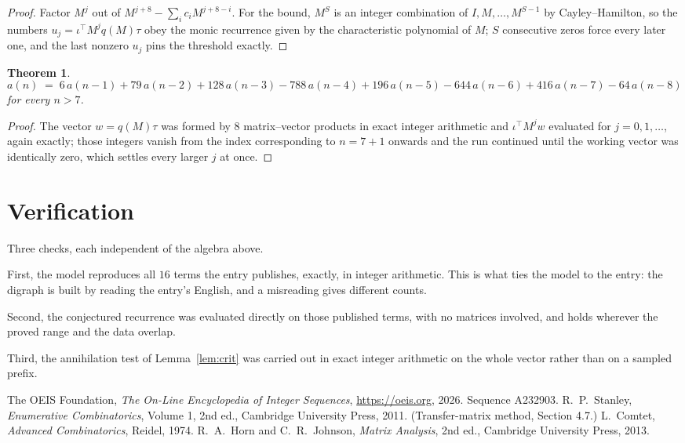 \documentclass[11pt,a4paper]{article}
\theoremstyle{plain}
\newtheorem{theorem}{Theorem}
\theoremstyle{definition}
\begin{document}
\begin{proof}
Factor $M^{j}$ out of $M^{j+8}-\sum_ic_iM^{j+8-i}$. For the bound, $M^{S}$
is an integer combination of $I,M,\dots,M^{S-1}$ by Cayley--Hamilton, so the numbers
$u_j=\iota^{\!\top}M^{j}q(M)\tau$ obey the monic recurrence given by the characteristic
polynomial of $M$; $S$ consecutive zeros force every later one, and the last nonzero $u_j$
pins the threshold exactly.
\end{proof}

\begin{theorem}
\[
a(n)\;=\;6\,a(n-1) + 79\,a(n-2) + 128\,a(n-3) - 788\,a(n-4) + 196\,a(n-5) - 644\,a(n-6) + 416\,a(n-7) - 64\,a(n-8)
\]
for every $n>7$.
\end{theorem}

\begin{proof}
The vector $w=q(M)\tau$ was formed by $8$ matrix--vector products in exact integer
arithmetic and $\iota^{\!\top}M^{j}w$ evaluated for $j=0,1,\dots$, again exactly; those
integers vanish from the index corresponding to $n=7+1$ onwards and the run continued
until the working vector was identically zero, which settles every larger $j$ at once.
\end{proof}

\section{Verification}

Three checks, each independent of the algebra above.

First, the model reproduces all $16$ terms the entry publishes, exactly, in integer
arithmetic. This is what ties the model to the entry: the digraph is built by reading the
entry's English, and a misreading gives different counts.

Second, the conjectured recurrence was evaluated directly on those published terms, with no
matrices involved, and holds wherever the proved range and the data overlap.

Third, the annihilation test of Lemma~\ref{lem:crit} was carried out in exact integer
arithmetic on the whole vector rather than on a sampled prefix.

\begin{thebibliography}{9}
 The OEIS Foundation, \emph{The On-Line Encyclopedia of Integer
Sequences}, \url{https://oeis.org}, 2026. Sequence A232903.
 R.~P.~Stanley, \emph{Enumerative Combinatorics}, Volume 1, 2nd ed.,
Cambridge University Press, 2011. (Transfer-matrix method, Section 4.7.)
 L.~Comtet, \emph{Advanced Combinatorics}, Reidel, 1974.
 R.~A.~Horn and C.~R.~Johnson, \emph{Matrix Analysis}, 2nd ed., Cambridge
University Press, 2013.
\end{thebibliography}
\end{document}
